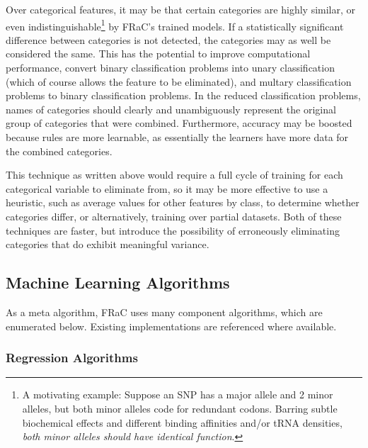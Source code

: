 \documentclass{article}
\begin{document}
\begin{multicols}{2}
Over categorical features, it may be that certain categories are highly similar, or even indistinguishable\footnote{A motivating example: Suppose an SNP has a major allele and 2 minor alleles, but both minor alleles code for redundant codons.  Barring subtle biochemical effects and different binding affinities and/or tRNA densities, \textit{both minor alleles should have identical function}.} by FRaC's trained models.  If a statistically significant difference between categories is not detected, the categories may as well be considered the same.  This has the potential to improve computational performance, convert binary classification problems into unary classification (which of course allows the feature to be eliminated), and multary classification problems to binary classification problems.  In the reduced classification problems, names of categories should clearly and unambiguously represent the original group of categories that were combined.  Furthermore, accuracy may be boosted because rules are more learnable, as essentially the learners have more data for the combined categories.

This technique as written above would require a full cycle of training for each categorical variable to eliminate from, so it may be more effective to use a heuristic, such as average values for other features by class, to determine whether categories differ, or alternatively, training over partial datasets.  Both of these techniques are faster, but introduce the possibility of erroneously eliminating categories that do exhibit meaningful variance.

\color{textcol}

\subsection{Machine Learning Algorithms}

\label{sec:alg:mlalgs}

As a meta algorithm, FRaC uses many component algorithms, which are enumerated below.  Existing implementations are referenced where available.


\subsubsection{Regression Algorithms}

\begin{enumerate}


\end{enumerate}
\end{multicols}
\end{document}
